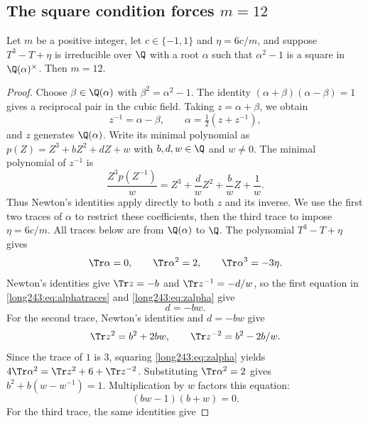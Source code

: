 \subsection{The square condition forces \texorpdfstring{$m=12$}{m=12}}

\begin{lemma}\label{long243:res:scaletwelve}
Let $m$ be a positive integer, let $c\in\{-1,1\}$ and $\eta=6c/m$, and suppose $T^3-T+\eta$ is
irreducible over $\Q$ with a root $\alpha$ such that $\alpha^2-1$ is a square
in $\Q(\alpha)^\times$.  Then $m=12$.
\end{lemma}

\begin{proof}
Choose $\beta\in\Q(\alpha)$ with $\beta^2=\alpha^2-1$. The identity
$(\alpha+\beta)(\alpha-\beta)=1$ gives a reciprocal pair in the cubic
field. Taking $z=\alpha+\beta$, we obtain
\begin{equation}\label{long243:eq:zalpha}
 z^{-1}=\alpha-\beta,\qquad \alpha=\tfrac12(z+z^{-1}),
\end{equation}
and $z$ generates $\Q(\alpha)$. Write its minimal polynomial as
$p(Z)=Z^3+bZ^2+dZ+w$ with $b,d,w\in\Q$ and $w\ne0$. The minimal
polynomial of $z^{-1}$ is
\[
 \frac{Z^3p(Z^{-1})}{w}
   =Z^3+\frac dwZ^2+\frac bwZ+\frac1w.
\]
Thus Newton's identities apply directly to both $z$ and its inverse.
We use the first two traces of $\alpha$ to restrict these coefficients,
then the third trace to impose $\eta=6c/m$. All traces below are from
$\Q(\alpha)$ to $\Q$.
The polynomial $T^3-T+\eta$ gives
\begin{equation}\label{long243:eq:alphatraces}
 \Tr\alpha=0,\qquad \Tr\alpha^2=2,\qquad \Tr\alpha^3=-3\eta .
\end{equation}
Newton's identities give $\Tr z=-b$ and $\Tr z^{-1}=-d/w$, so the first
equation in \eqref{long243:eq:alphatraces} and \eqref{long243:eq:zalpha} give
\begin{equation}\label{long243:eq:dbw}
 d=-bw .
\end{equation}
For the second trace, Newton's identities and $d=-bw$ give
\[
 \Tr z^2=b^2+2bw,\qquad \Tr z^{-2}=b^2-2b/w.
\]
Since the trace of $1$ is $3$, squaring
\eqref{long243:eq:zalpha} yields
$4\Tr\alpha^2=\Tr z^2+6+\Tr z^{-2}$. Substituting
$\Tr\alpha^2=2$ gives $b^2+b(w-w^{-1})=1$.
Multiplication by $w$ factors this equation:
\begin{equation}\label{long243:eq:factored}
 (bw-1)(b+w)=0 .
\end{equation}
For the third trace, the same identities give

\end{proof}
